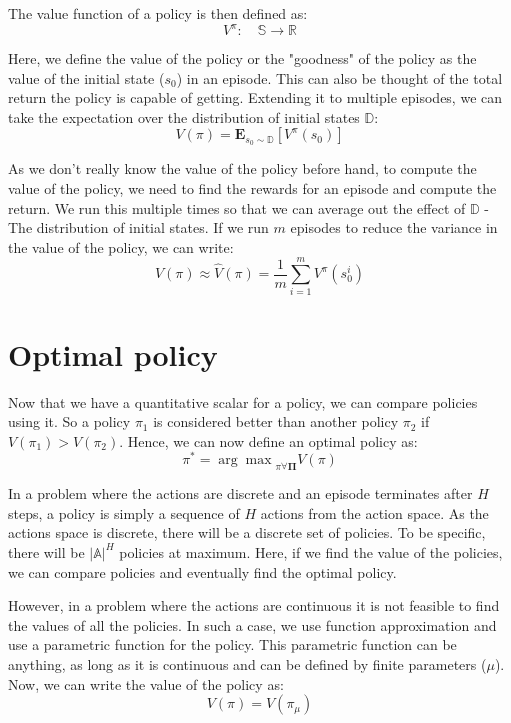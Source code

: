 \documentclass[BTech]{iitmdiss}
\begin{document}
The value function of a policy is then defined as:
\begin{equation}
  V^{\pi} : \quad \mathbb{S} \rightarrow \mathbb{R}
\end{equation}

Here, we define the value of the policy or the "goodness" of the policy as the value of the initial state ($s_{0}$) in an episode. This can also be thought of the total return the policy is capable of getting. Extending it to multiple episodes, we can take the expectation over the distribution of initial states $\mathbb{D}$:
\begin{equation}
  V(\pi) = \mathbf{E}_{s_{0} \sim \mathbb{D}} [ V^{\pi} (s_{0})]
\end{equation}

As we don't really know the value of the policy before hand, to compute the value of the policy, we need to find the rewards for an episode and compute the return. We run this multiple times so that we can average out the effect of $\mathbb{D}$ - The distribution of initial states. If we run $m$ episodes to reduce the variance in the value of the policy, we can write:
\begin{equation}
  V(\pi) \approx \hat{V}(\pi) = \frac{1}{m} \sum_{i=1}^{m} V^{\pi} (s_{0}^{i})
\end{equation}

\section{Optimal policy}

Now that we have a quantitative scalar for a policy, we can compare policies using it. So a policy $\pi_{1}$ is considered better than another policy $\pi_{2}$ if $V(\pi_{1}) > V(\pi_{2})$. Hence, we can now define an optimal policy as:
\begin{equation}
  \pi^{*} = {\arg \max}_{\pi \forall \mathbf{\Pi}} {V(\pi)}
\end{equation}

In a problem where the actions are discrete and an episode terminates after $H$ steps, a policy is simply a sequence of $H$ actions from the action space. As the actions space is discrete, there will be a discrete set of policies. To be specific, there will be $|\mathbb{A}|^{H}$ policies at maximum. Here, if we find the value of the policies, we can compare policies and eventually find the optimal policy.

However, in a problem where the actions are continuous it is not feasible to find the values of all the policies. In such a case, we use function approximation and use a parametric function for the policy. This parametric function can be anything, as long as it is continuous and can be defined by finite parameters ($\mu$). Now, we can write the value of the policy as:
\begin{equation}
  V(\pi) = V(\pi_{\mu})
\end{equation}
\end{document}
